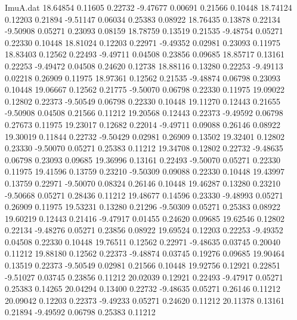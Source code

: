 \begin{filecontents}{ImuA.dat}
  18.64854    0.11605    0.22732   -9.47677    0.00691    0.21566    0.10448
  18.74124    0.12203    0.21894   -9.51147    0.06034    0.25383    0.08922
  18.76435    0.13878    0.22134   -9.50908    0.05271    0.23093    0.08159
  18.78759    0.13519    0.21535   -9.48754    0.05271    0.22330    0.10448
  18.81024    0.12203    0.22971   -9.49352    0.02981    0.23093    0.11975
  18.83403    0.12562    0.22493   -9.49711    0.04508    0.23856    0.09685
  18.85717    0.13161    0.22253   -9.49472    0.04508    0.24620    0.12738
  18.88116    0.13280    0.22253   -9.49113    0.02218    0.26909    0.11975
  18.97361    0.12562    0.21535   -9.48874    0.06798    0.23093    0.10448
  19.06667    0.12562    0.21775   -9.50070    0.06798    0.22330    0.11975
  19.09022    0.12802    0.22373   -9.50549    0.06798    0.22330    0.10448
  19.11270    0.12443    0.21655   -9.50908    0.04508    0.21566    0.11212
  19.20568    0.12443    0.22373   -9.49592    0.06798    0.27673    0.11975
  19.23017    0.12682    0.22014   -9.49711    0.09088    0.26146    0.08922
  19.30019    0.11844    0.22732   -9.50429    0.02981    0.26909    0.13502
  19.32401    0.12802    0.23330   -9.50070    0.05271    0.25383    0.11212
  19.34708    0.12802    0.22732   -9.48635    0.06798    0.23093    0.09685
  19.36996    0.13161    0.22493   -9.50070    0.05271    0.22330    0.11975
  19.41596    0.13759    0.23210   -9.50309    0.09088    0.22330    0.10448
  19.43997    0.13759    0.22971   -9.50070    0.08324    0.26146    0.10448
  19.46287    0.13280    0.23210   -9.50668    0.05271    0.28436    0.11212
  19.48677    0.14596    0.23330   -9.48993    0.05271    0.26909    0.11975
  19.53231    0.13280    0.21296   -9.50309    0.05271    0.25383    0.08922
  19.60219    0.12443    0.21416   -9.47917    0.01455    0.24620    0.09685
  19.62546    0.12802    0.22134   -9.48276    0.05271    0.23856    0.08922
  19.69524    0.12203    0.22253   -9.49352    0.04508    0.22330    0.10448
  19.76511    0.12562    0.22971   -9.48635    0.03745    0.20040    0.11212
  19.88180    0.12562    0.22373   -9.48874    0.03745    0.19276    0.09685
  19.90464    0.13519    0.22373   -9.50549    0.02981    0.21566    0.10448
  19.92756    0.12921    0.22851   -9.51027    0.03745    0.23856    0.11212
  20.02039    0.12921    0.22493   -9.47917    0.05271    0.25383    0.14265
  20.04294    0.13400    0.22732   -9.48635    0.05271    0.26146    0.11212
  20.09042    0.12203    0.22373   -9.49233    0.05271    0.24620    0.11212
  20.11378    0.13161    0.21894   -9.49592    0.06798    0.25383    0.11212

\end{filecontents}
